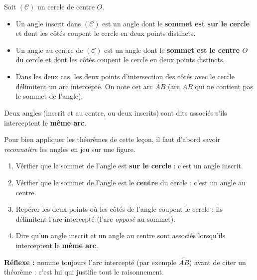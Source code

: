\documentclass[11pt]{article}
\newcommand{\cle}[1]{{\popxbold\color{popdark}#1}}
\begin{document}
\begin{definition}
Soit $(\mathcal{C})$ un cercle de centre $O$.
\begin{itemize}
\item Un \cle{angle inscrit} dans $(\mathcal{C})$ est un angle dont le \textbf{sommet est sur le cercle} et dont les côtés coupent le cercle en deux points distincts.
\item Un \cle{angle au centre} de $(\mathcal{C})$ est un angle dont le \textbf{sommet est le centre $O$} du cercle et dont les côtés coupent le cercle en deux points distincts.
\item Dans les deux cas, les deux points d'intersection des côtés avec le cercle délimitent un \cle{arc intercepté}. On note cet arc $\overset{\frown}{AB}$ (arc $AB$ qui ne contient pas le sommet de l'angle).
\end{itemize}
Deux angles (inscrit et au centre, ou deux inscrits) sont dits \cle{associés} s'ils interceptent le \textbf{même arc}.
\end{definition}

\begin{methode}
Pour bien appliquer les théorèmes de cette leçon, il faut d'abord savoir \emph{reconnaître} les angles en jeu sur une figure.
\begin{enumerate}
\item Vérifier que le \cle{sommet} de l'angle est \textbf{sur le cercle} : c'est un \cle{angle inscrit}.
\item Vérifier que le sommet de l'angle est le \textbf{centre} du cercle : c'est un \cle{angle au centre}.
\item Repérer les deux points où les côtés de l'angle coupent le cercle : ils délimitent l'\cle{arc intercepté} (l'arc \emph{opposé} au sommet).
\item Dire qu'un angle inscrit et un angle au centre sont \cle{associés} lorsqu'ils interceptent le \textbf{même arc}.
\end{enumerate}
\textbf{Réflexe :} nomme toujours l'arc intercepté (par exemple $\overset{\frown}{AB}$) avant de citer un théorème : c'est lui qui justifie tout le raisonnement.
\end{methode}
\end{document}
